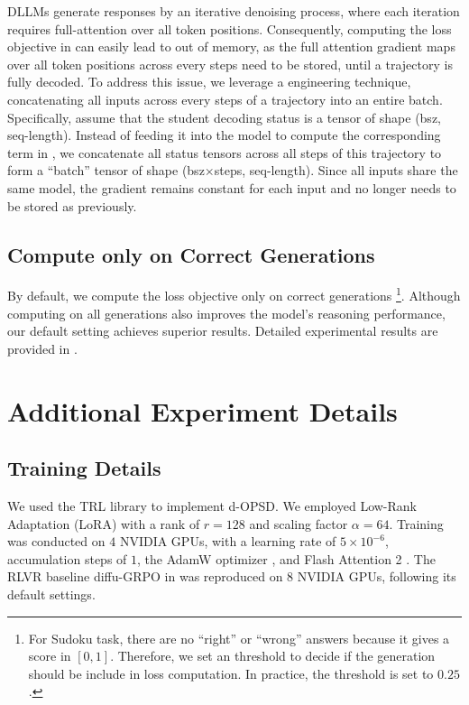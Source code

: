 \documentclass{llmxive}
\begin{document}
DLLMs generate responses by an iterative denoising process, where each iteration requires full-attention over all token positions. Consequently, computing the loss objective in  can easily lead to out of memory, as the full attention gradient maps over all token positions across every steps need to be stored, until a trajectory is fully decoded. To address this issue, we leverage a engineering technique, concatenating all inputs across every steps of a trajectory into an entire batch. Specifically, assume that the student decoding status is a tensor of shape (bsz, seq-length). Instead of feeding it into the model to compute the corresponding term in , we concatenate all status tensors across all steps of this trajectory to form a ``batch'' tensor of shape (bsz$\times$steps, seq-length). Since all inputs share the same model, the gradient remains constant for each input and no longer needs to be stored as previously.

\subsection{Compute only on Correct Generations}


By default, we compute the loss objective  only on correct generations \footnote{For Sudoku task, there are no ``right'' or ``wrong'' answers because it gives a score in $[0, 1]$. Therefore, we set an threshold to decide if the generation should be include in loss computation. In practice, the threshold is set to $0.25$.}. Although computing on all generations also improves the model's reasoning performance, our default setting achieves superior results. Detailed experimental results are provided in .


\section{Additional Experiment Details}


\subsection{Training Details} \label{app4.1} 


We used the TRL library \citep{vonwerra2020trl} to implement d-OPSD. We employed Low-Rank Adaptation (LoRA) with a rank of $r = 128$ and scaling factor $\alpha = 64$. Training was conducted on $4$ NVIDIA GPUs, with a learning rate of $5 \times 10^{-6}$, accumulation steps of $1$, the AdamW optimizer \citep{loshchilov2017decoupled}, and Flash Attention 2 \citep{dao2023flashattention}. The RLVR baseline diffu-GRPO \citep{zhao2025d1} in  was reproduced on $8$ NVIDIA GPUs, following its default settings.
\end{document}
